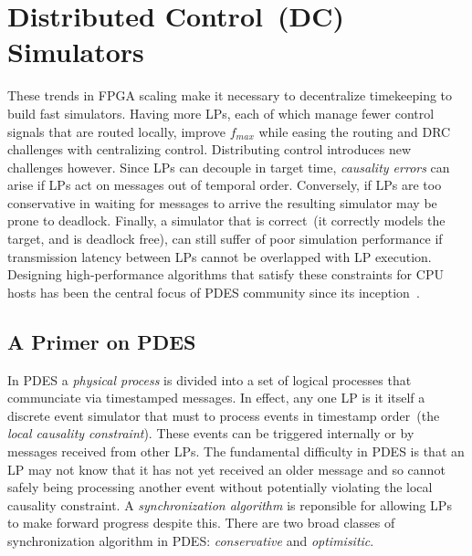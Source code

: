 \section{Distributed Control~(DC) Simulators}
These trends in FPGA scaling make it necessary to decentralize timekeeping to
build fast simulators.  Having more LPs, each of which manage fewer control
signals that are routed locally, improve ${f_{max}}$ while easing the routing and
DRC challenges with centralizing control. Distributing control introduces new
challenges however.  Since LPs can decouple in target time, \emph{causality errors} can
arise if LPs act on messages out of temporal order. Conversely, if LPs are too
conservative in waiting for messages to arrive the resulting simulator may be prone to deadlock.
Finally, a simulator that is correct~(it correctly models the target, and is
deadlock free), can still suffer of poor simulation performance if transmission
latency between LPs cannot be overlapped with LP execution. Designing
high-performance algorithms that satisfy these constraints for CPU hosts has been the central focus of PDES
community since its inception~\cite{PDESFujimotoPrimer}.

\subsection{A Primer on PDES}

In PDES a \emph{physical process} is divided into a set of logical processes
that communciate via timestamped messages. In effect, any one LP is it itself a discrete
event simulator that must to process events in timestamp order~(the
\emph{local causality constraint}). These events can be triggered internally or
by messages received from other LPs. The fundamental difficulty in PDES is that
an LP may not know that it has not yet received an older message and so cannot
safely being processing another event without potentially violating the local
causality constraint. A \emph{synchronization algorithm} is reponsible for
allowing LPs to make forward progress despite this. There are two broad classes of synchronization algorithm in PDES:
\emph{conservative} and \emph{optimisitic}.


